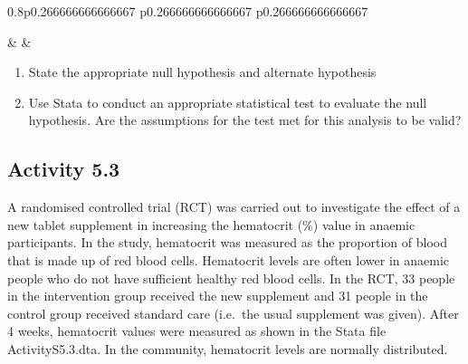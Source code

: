 \documentclass[
]{memoir}
\providecommand{\tightlist}{%
  \setlength{\itemsep}{0pt}\setlength{\parskip}{0pt}}
\begin{document}
\begin{table}[ht]
\begin{centerbox}
\begin{threeparttable}
\begin{tabularx}{0.8\textwidth}{p{} p{} p{}}
\hhline{}

 &
 &
 \tabularnewline[-0.5pt]


\end{tabularx}
\end{threeparttable}\par\end{centerbox}

\end{table}
 

\begin{enumerate}
\def\labelenumi{\alph{enumi})}
\tightlist
\item
  State the appropriate null hypothesis and alternate hypothesis
\item
  Use Stata to conduct an appropriate statistical test to evaluate the null hypothesis. Are the assumptions for the test met for this analysis to be valid?
\end{enumerate}

\hypertarget{activity-5.3}{%
\subsection*{Activity 5.3}\label{activity-5.3}}

A randomised controlled trial (RCT) was carried out to investigate the effect of a new tablet supplement in increasing the hematocrit (\%) value in anaemic participants. In the study, hematocrit was measured as the proportion of blood that is made up of red blood cells. Hematocrit levels are often lower in anaemic people who do not have sufficient healthy red blood cells. In the RCT, 33 people in the intervention group received the new supplement and 31 people in the control group received standard care (i.e.~the usual supplement was given). After 4 weeks, hematocrit values were measured as shown in the Stata file ActivityS5.3.dta. In the community, hematocrit levels are normally distributed.
\end{document}
